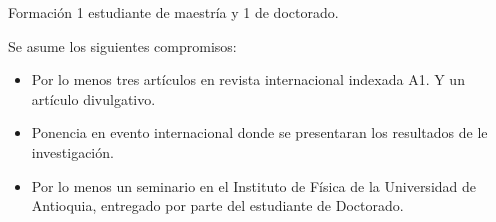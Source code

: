 Formación 1 estudiante de maestría y 1 de doctorado.

\begin{ideas}

Se asume los siguientes compromisos:

\begin{itemize}

\item Por lo menos tres artículos en revista internacional indexada
  A1. Y un artículo divulgativo.

\item Ponencia en evento internacional donde se presentaran los resultados de le
  investigación.

\item
Por lo menos un seminario en el Instituto de Física de la Universidad
de Antioquia, entregado por parte del estudiante de Doctorado.

\end{itemize}
\end{ideas}


